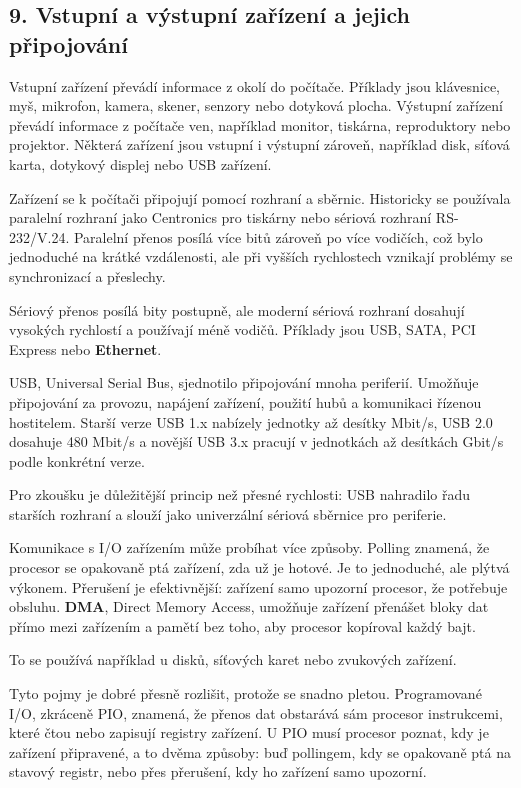 \documentclass[11pt,a4paper]{article}
\begin{document}
\subsection*{9. Vstupní a výstupní zařízení a jejich připojování}

Vstupní zařízení převádí informace z okolí do počítače. Příklady jsou klávesnice, myš, mikrofon, kamera, skener, senzory nebo dotyková plocha. Výstupní zařízení převádí informace z počítače ven, například monitor, tiskárna, reproduktory nebo projektor. Některá zařízení jsou vstupní i výstupní zároveň, například disk, síťová karta, dotykový displej nebo USB zařízení.

Zařízení se k počítači připojují pomocí rozhraní a sběrnic. Historicky se používala paralelní rozhraní jako Centronics pro tiskárny nebo sériová rozhraní RS-232/V.24. Paralelní přenos posílá více bitů zároveň po více vodičích, což bylo jednoduché na krátké vzdálenosti, ale při vyšších rychlostech vznikají problémy se synchronizací a přeslechy.

Sériový přenos posílá bity postupně, ale moderní sériová rozhraní dosahují vysokých rychlostí a používají méně vodičů. Příklady jsou USB, SATA, PCI Express nebo \textbf{Ethernet}.

USB, Universal Serial Bus, sjednotilo připojování mnoha periferií. Umožňuje připojování za provozu, napájení zařízení, použití hubů a komunikaci řízenou hostitelem. Starší verze USB 1.x nabízely jednotky až desítky Mbit/s, USB 2.0 dosahuje 480 Mbit/s a novější USB 3.x pracují v jednotkách až desítkách Gbit/s podle konkrétní verze.

Pro zkoušku je důležitější princip než přesné rychlosti: USB nahradilo řadu starších rozhraní a slouží jako univerzální sériová sběrnice pro periferie.

Komunikace s I/O zařízením může probíhat více způsoby. Polling znamená, že procesor se opakovaně ptá zařízení, zda už je hotové. Je to jednoduché, ale plýtvá výkonem. Přerušení je efektivnější: zařízení samo upozorní procesor, že potřebuje obsluhu. \textbf{DMA}, Direct Memory Access, umožňuje zařízení přenášet bloky dat přímo mezi zařízením a pamětí bez toho, aby procesor kopíroval každý bajt.

To se používá například u disků, síťových karet nebo zvukových zařízení.

Tyto pojmy je dobré přesně rozlišit, protože se snadno pletou. Programované I/O, zkráceně PIO, znamená, že přenos dat obstarává sám procesor instrukcemi, které čtou nebo zapisují registry zařízení. U PIO musí procesor poznat, kdy je zařízení připravené, a to dvěma způsoby: buď pollingem, kdy se opakovaně ptá na stavový registr, nebo přes přerušení, kdy ho zařízení samo upozorní.
\end{document}
